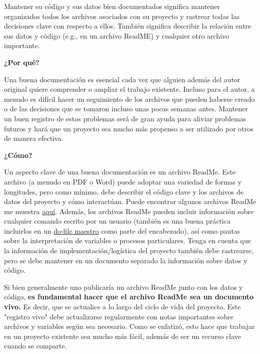 \documentclass[11pt,en]{elegantpaper}
\begin{document}
Mantener su código y sus datos bien documentados significa mantener organizados todos los archivos asociados con su proyecto y rastrear todas las decisiones clave con respecto a ellos. También significa describir la relación entre sus datos y código (e.g., en un archivo ReadME) y cualquier otro archivo importante.

\noindent
\textbf{¿Por qué?}

Una buena documentación es esencial cada vez que alguien además del autor original quiere comprender o ampliar el trabajo existente. Incluso para el autor, a menudo es difícil hacer un seguimiento de los archivos que pueden haberse creado o de las decisiones que se tomaron incluso unas pocas semanas antes. Mantener un buen registro de estos problemas será de gran ayuda para aliviar problemas futuros y hará que un proyecto sea mucho más propenso a ser utilizado por otros de manera efectiva.

\noindent
\textbf{¿Cómo?}

Un aspecto clave de una buena documentación es un archivo ReadMe. Este archivo (a menudo en PDF o Word) puede adoptar una variedad de formas y longitudes, pero como mínimo, debe describir el código clave y los archivos de datos del proyecto y cómo interactúan. Puede encontrar algunos archivos ReadMe me muestra \href{http://www.poverty-action.org/research-transparency/example-readme-files}{aquí}. Además, los archivos ReadMe pueden incluir información sobre cualquier comando escrito por un usuario (también es una buena práctica incluirlos en un \href{http://www.poverty-action.org/research-transparency/example-master}{do-file maestro} como parte del encabezado), así como pautas sobre la interpretación de variables o procesos particulares. Tenga en cuenta que la información de implementación/logística del proyecto también debe rastrearse, pero se debe mantener en un documento separado la información sobre datos y código.

Si bien generalmente uno publicaría un archivo ReadMe junto con los datos y código, \textbf{es fundamental hacer que el archivo ReadMe sea un documento vivo.} Es decir, que se actualice a lo largo del ciclo de vida del proyecto. Este "registro vivo" debe actualizarse regularmente con notas importantes sobre archivos y variables según sea necesario. Como se enfatizó, esto hace que trabajar en un proyecto existente sea mucho más fácil, además de ser un recurso clave cuando se comparte.
\end{document}
